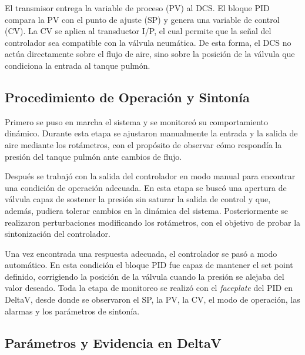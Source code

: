 \documentclass[12pt,letterpaper]{article}
\begin{document}
El transmisor entrega la variable de proceso (PV) al DCS. El bloque PID compara la PV con el punto de ajuste (SP) y genera una variable de control (CV). La CV se aplica al transductor I/P, el cual permite que la señal del controlador sea compatible con la válvula neumática. De esta forma, el DCS no actúa directamente sobre el flujo de aire, sino sobre la posición de la válvula que condiciona la entrada al tanque pulmón.

\subsection*{Procedimiento de Operación y Sintonía}

Primero se puso en marcha el sistema y se monitoreó su comportamiento dinámico. Durante esta etapa se ajustaron manualmente la entrada y la salida de aire mediante los rotámetros, con el propósito de observar cómo respondía la presión del tanque pulmón ante cambios de flujo.

Después se trabajó con la salida del controlador en modo manual para encontrar una condición de operación adecuada. En esta etapa se buscó una apertura de válvula capaz de sostener la presión sin saturar la salida de control y que, además, pudiera tolerar cambios en la dinámica del sistema. Posteriormente se realizaron perturbaciones modificando los rotámetros, con el objetivo de probar la sintonización del controlador.

Una vez encontrada una respuesta adecuada, el controlador se pasó a modo automático. En esta condición el bloque PID fue capaz de mantener el set point definido, corrigiendo la posición de la válvula cuando la presión se alejaba del valor deseado. Toda la etapa de monitoreo se realizó con el \textit{faceplate} del PID en DeltaV, desde donde se observaron el SP, la PV, la CV, el modo de operación, las alarmas y los parámetros de sintonía.

\subsection*{Parámetros y Evidencia en DeltaV}
\end{document}
